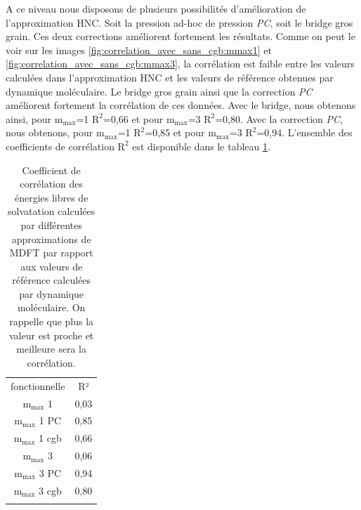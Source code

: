A ce niveau nous disposons de plusieurs possibilités d'amélioration de l'approximation HNC. Soit la pression ad-hoc de pression \textit{PC}, soit le bridge gros grain. Ces deux corrections améliorent fortement les résultats. Comme on peut le voir sur les images \ref{fig:correlation_avec_sans_cgb:mmax1} et \ref{fig:correlation_avec_sans_cgb:mmax3}, la corrélation est faible entre les valeurs calculées dans l'approximation HNC et les valeurs de référence obtenues par dynamique moléculaire. 
Le bridge gros grain ainsi que la correction \textit{PC} améliorent fortement la corrélation de ces données. Avec le bridge, nous obtenons ainsi, pour $\mathrm{m}_\mathrm{max}$=1 $\mathrm{R}^2$=0,66 et pour $\mathrm{m}_\mathrm{max}$=3 $\mathrm{R}^2$=0,80. Avec la correction \textit{PC}, nous obtenons, pour $\mathrm{m}_\mathrm{max}$=1 $\mathrm{R}^2$=0,85 et pour $\mathrm{m}_\mathrm{max}$=3 $\mathrm{R}^2$=0,94. L'ensemble des coefficients de corrélation $\mathrm{R}^2$ est disponible dans le tableau \ref{tab:correlation}.



\begin{table}[ht]
  \begin{center}
    \begin{tabular}{c c}
      \hline & \\[-1em]\hline
       fonctionnelle  & R²  \\
      \hline
       $\mathrm{m}_\mathrm{max}$ 1      & 0,03  \\
       $\mathrm{m}_\mathrm{max}$ 1 PC   & 0,85  \\
       $\mathrm{m}_\mathrm{max}$ 1 cgb  & 0,66  \\
       $\mathrm{m}_\mathrm{max}$ 3      & 0,06  \\
       $\mathrm{m}_\mathrm{max}$ 3 PC   & 0,94  \\
       $\mathrm{m}_\mathrm{max}$ 3 cgb  & 0,80  \\
      \hline & \\[-1em]\hline%
    \end{tabular}
  \end{center}
  \caption[Coefficient de corrélation des énergies libres de solvatation calculées par MDFT par rapport aux valeurs calculées par DM.]{Coefficient de corrélation des énergies libres de solvatation calculées par différentes approximations de MDFT par rapport aux valeurs de référence calculées par dynamique moléculaire. On rappelle que plus la valeur est proche et meilleure sera la corrélation.}
  \label{tab:correlation}  
\end{table}



